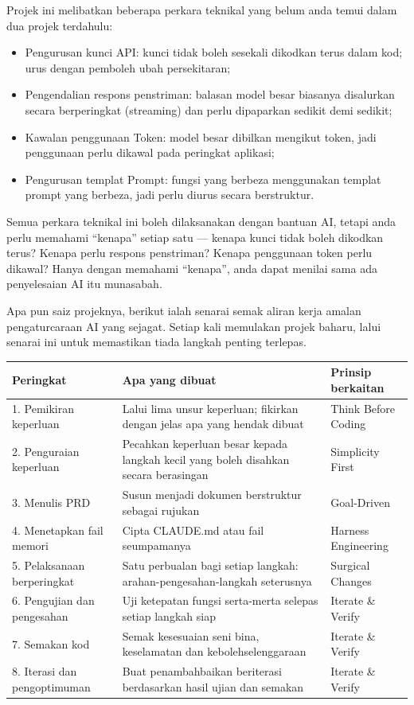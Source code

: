 
Projek ini melibatkan beberapa perkara teknikal yang belum anda temui dalam dua projek terdahulu:

\begin{itemize}
  \item Pengurusan kunci API: kunci tidak boleh sesekali dikodkan terus dalam kod; urus dengan pemboleh ubah persekitaran;
  \item Pengendalian respons penstriman: balasan model besar biasanya disalurkan secara berperingkat (streaming) dan perlu dipaparkan sedikit demi sedikit;
  \item Kawalan penggunaan Token: model besar dibilkan mengikut token, jadi penggunaan perlu dikawal pada peringkat aplikasi;
  \item Pengurusan templat Prompt: fungsi yang berbeza menggunakan templat prompt yang berbeza, jadi perlu diurus secara berstruktur.
\end{itemize}

Semua perkara teknikal ini boleh dilaksanakan dengan bantuan AI, tetapi anda perlu memahami “kenapa” setiap satu — kenapa kunci tidak boleh dikodkan terus? Kenapa perlu respons penstriman? Kenapa penggunaan token perlu dikawal? Hanya dengan memahami “kenapa”, anda dapat menilai sama ada penyelesaian AI itu munasabah.


Apa pun saiz projeknya, berikut ialah senarai semak aliran kerja amalan pengaturcaraan AI yang sejagat. Setiap kali memulakan projek baharu, lalui senarai ini untuk memastikan tiada langkah penting terlepas.

\begin{center}
\begin{tabularx}{\linewidth}{|X|X|X|}
\hline
\textbf{Peringkat} & \textbf{Apa yang dibuat} & \textbf{Prinsip berkaitan} \tabularnewline
\hline
1. Pemikiran keperluan & Lalui lima unsur keperluan; fikirkan dengan jelas apa yang hendak dibuat & Think Before Coding \tabularnewline
2. Penguraian keperluan & Pecahkan keperluan besar kepada langkah kecil yang boleh disahkan secara berasingan & Simplicity First \tabularnewline
3. Menulis PRD & Susun menjadi dokumen berstruktur sebagai rujukan & Goal-Driven \tabularnewline
4. Menetapkan fail memori & Cipta CLAUDE.md atau fail seumpamanya & Harness Engineering \tabularnewline
5. Pelaksanaan berperingkat & Satu perbualan bagi setiap langkah: arahan-pengesahan-langkah seterusnya & Surgical Changes \tabularnewline
6. Pengujian dan pengesahan & Uji ketepatan fungsi serta-merta selepas setiap langkah siap & Iterate \& Verify \tabularnewline
7. Semakan kod & Semak kesesuaian seni bina, keselamatan dan kebolehselenggaraan & Iterate \& Verify \tabularnewline
8. Iterasi dan pengoptimuman & Buat penambahbaikan beriterasi berdasarkan hasil ujian dan semakan & Iterate \& Verify \tabularnewline
\hline
\end{tabularx}
\end{center}

